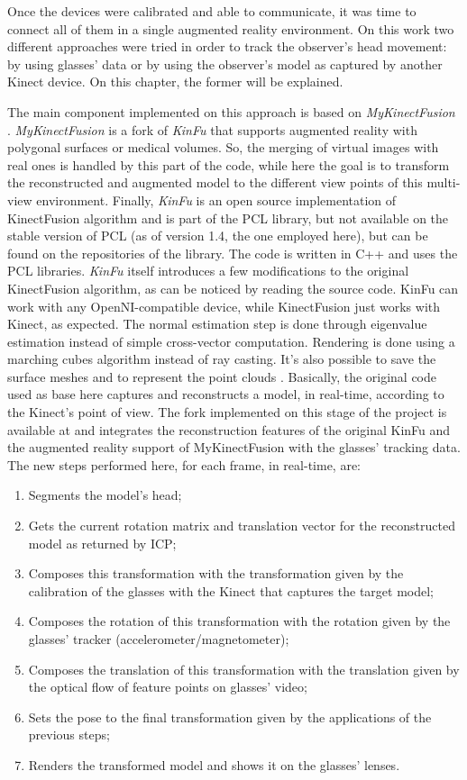 \documentclass[msc, a4paper, classic, en]{ufbathesis}
\begin{document}
Once the devices were calibrated and able to communicate, it was time to connect all of them in a single augmented reality environment. On this work two different approaches were tried in order to track the observer's head movement: by using glasses' data or by using the observer's model as captured by another Kinect device. On this chapter, the former will be explained.

The main component implemented on this approach is based on \textit{MyKinectFusion} \cite{marcio}. \textit{MyKinectFusion} is a fork of \textit{KinFu} that supports augmented reality with polygonal surfaces or medical volumes. So, the merging of virtual images with real ones is handled by this part of the code, while here the goal is to transform the reconstructed and augmented model to the different view points of this multi-view environment. Finally, \textit{KinFu} is an open source implementation of KinectFusion algorithm and is part of the PCL library, but not available on the stable version of PCL (as of version 1.4, the one employed here), but can be found on the repositories of the library. The code is written in C++ and uses the PCL libraries. \textit{KinFu} itself introduces a few modifications to the original KinectFusion algorithm, as can be noticed by reading the source code. KinFu can work with any OpenNI-compatible device, while KinectFusion just works with Kinect, as expected. The normal estimation step is done through eigenvalue estimation instead of simple cross-vector computation. Rendering is done using a marching cubes algorithm instead of ray casting. It's also possible to save the surface meshes and to represent the point clouds \cite{michele}. Basically, the original code used as base here captures and reconstructs a model, in real-time, according to the Kinect's point of view. The fork implemented on this stage of the project is available at \cite{mykinfu} and integrates the reconstruction features of the original KinFu and the augmented reality support of MyKinectFusion with the glasses' tracking data. The new steps performed here, for each frame, in real-time, are:

\begin{enumerate}
  \item Segments the model's head;
  \item Gets the current rotation matrix and translation vector for the reconstructed model as returned by ICP;
  \item Composes this transformation with the transformation given by the calibration of the glasses with the Kinect that captures the target model;
  \item Composes the rotation of this transformation with the rotation given by the glasses' tracker (accelerometer/magnetometer);
  \item Composes the translation of this transformation with the translation given by the optical flow of feature points on glasses' video;
  \item Sets the pose to the final transformation given by the applications of the previous steps;
  \item Renders the transformed model and shows it on the glasses' lenses.
\end{enumerate}
\end{document}
